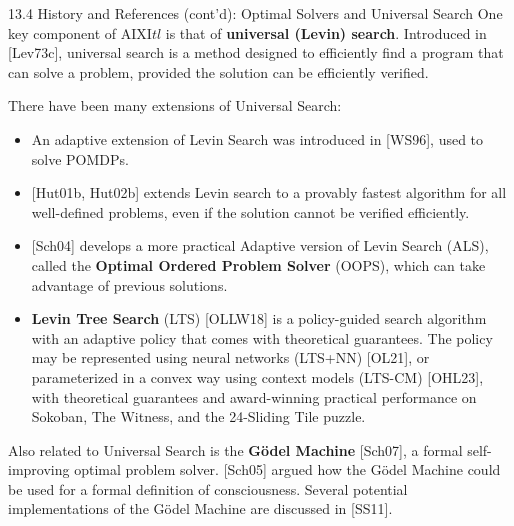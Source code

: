 \documentclass[aspectratio=169,10pt]{beamer}
\begin{document}
\begin{frame}[allowframebreaks]{13.4 History and References (cont'd): Optimal Solvers and Universal Search}
  One key component of AIXI$tl$ is that of \textbf{universal (Levin) search}.
  Introduced in [Lev73c], universal search is a method designed to
  efficiently find a program that can solve a problem, provided the
  solution can be efficiently verified.

  \bigskip
  There have been many extensions of Universal Search:
  \begin{itemize}
    \item An adaptive extension of Levin Search was introduced in [WS96],
      used to solve POMDPs.
    \item {[Hut01b, Hut02b]} extends Levin search to a provably fastest
      algorithm for all well-defined problems, even if the solution cannot
      be verified efficiently.
    \item {[Sch04]} develops a more practical Adaptive version of Levin
      Search (ALS), called the \textbf{Optimal Ordered Problem Solver}
      (OOPS), which can take advantage of previous solutions.
    \item \textbf{Levin Tree Search} (LTS) [OLLW18] is a policy-guided
      search algorithm with an adaptive policy that comes with theoretical
      guarantees. The policy may be represented using neural networks
      (LTS+NN) [OL21], or parameterized in a convex way using context
      models (LTS-CM) [OHL23], with theoretical guarantees and
      award-winning practical performance on Sokoban, The Witness, and the
      24-Sliding Tile puzzle.
  \end{itemize}

  \bigskip
  Also related to Universal Search is the \textbf{G\"odel Machine}
  [Sch07], a formal self-improving optimal problem solver. [Sch05] argued
  how the G\"odel Machine could be used for a formal definition of
  consciousness. Several potential implementations of the G\"odel Machine
  are discussed in [SS11].
\end{frame}

\end{document}
